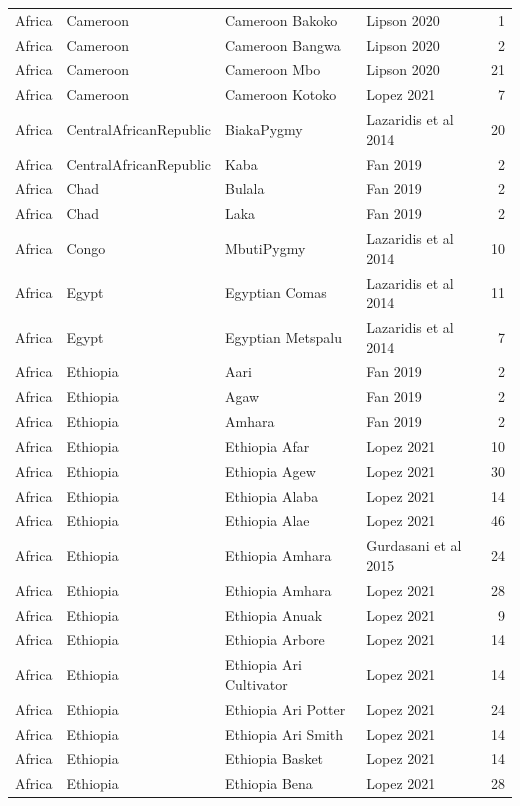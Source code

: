 \begin{longtable}[t]{lll>{\raggedright\arraybackslash}p{9em}r}
\addlinespace
Africa & Cameroon & Cameroon Bakoko & Lipson 2020 & 1\\
Africa & Cameroon & Cameroon Bangwa & Lipson 2020 & 2\\
Africa & Cameroon & Cameroon Mbo & Lipson 2020 & 21\\
Africa & Cameroon & Cameroon Kotoko & Lopez 2021 & 7\\
Africa & CentralAfricanRepublic & BiakaPygmy & Lazaridis et al 2014 & 20\\
\addlinespace
Africa & CentralAfricanRepublic & Kaba & Fan 2019 & 2\\
Africa & Chad & Bulala & Fan 2019 & 2\\
Africa & Chad & Laka & Fan 2019 & 2\\
Africa & Congo & MbutiPygmy & Lazaridis et al 2014 & 10\\
Africa & Egypt & Egyptian Comas & Lazaridis et al 2014 & 11\\
\addlinespace
Africa & Egypt & Egyptian Metspalu & Lazaridis et al 2014 & 7\\
Africa & Ethiopia & Aari & Fan 2019 & 2\\
Africa & Ethiopia & Agaw & Fan 2019 & 2\\
Africa & Ethiopia & Amhara & Fan 2019 & 2\\
Africa & Ethiopia & Ethiopia Afar & Lopez 2021 & 10\\
\addlinespace
Africa & Ethiopia & Ethiopia Agew & Lopez 2021 & 30\\
Africa & Ethiopia & Ethiopia Alaba & Lopez 2021 & 14\\
Africa & Ethiopia & Ethiopia Alae & Lopez 2021 & 46\\
Africa & Ethiopia & Ethiopia Amhara & Gurdasani et al 2015 & 24\\
Africa & Ethiopia & Ethiopia Amhara & Lopez 2021 & 28\\
\addlinespace
Africa & Ethiopia & Ethiopia Anuak & Lopez 2021 & 9\\
Africa & Ethiopia & Ethiopia Arbore & Lopez 2021 & 14\\
Africa & Ethiopia & Ethiopia Ari Cultivator & Lopez 2021 & 14\\
Africa & Ethiopia & Ethiopia Ari Potter & Lopez 2021 & 24\\
Africa & Ethiopia & Ethiopia Ari Smith & Lopez 2021 & 14\\
\addlinespace
Africa & Ethiopia & Ethiopia Basket & Lopez 2021 & 14\\
Africa & Ethiopia & Ethiopia Bena & Lopez 2021 & 28\\

\end{longtable}
